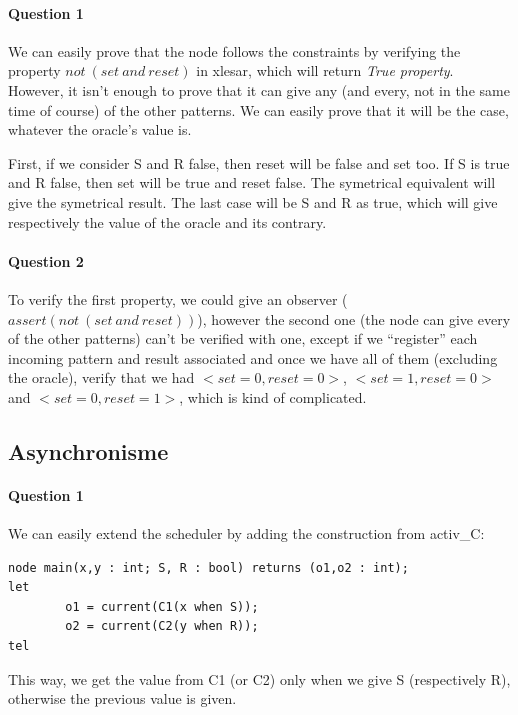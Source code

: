 \documentclass{article}
\begin{document}
\paragraph{Question 1} 

We can easily prove that the node follows the constraints
by verifying the property $not~(set~ and~ reset)$ in xlesar, which will return
\emph{True property}. However, it isn't enough to prove that it can give any
(and every, not in the same time of course) of the other patterns. We can easily
prove that it will be the case, whatever the oracle's value is.

First, if we consider S and R false, then reset will be false and set too. If
S is true and R false, then set will be true and reset false. The symetrical
equivalent will give the symetrical result. The last case will be S and R as
true, which will give respectively the value of the oracle and its contrary.

\paragraph{Question 2} 

To verify the first property, we could give an observer ($assert(not~(set~ and~
reset))$), however the second one (the node can give every of the other
patterns) can't be verified with one, except if we ``register'' each incoming
pattern and result associated  and once we have all of them (excluding the
oracle), verify that we had $<set=0, reset=0>$, $<set=1, reset=0>$ and $<set=0,
reset=1>$, which is kind of complicated.

\subsection{Asynchronisme}

\paragraph{Question 1}

We can easily extend the scheduler by adding the construction from activ\_C:

\begin{verbatim}
node main(x,y : int; S, R : bool) returns (o1,o2 : int);
let
        o1 = current(C1(x when S));
        o2 = current(C2(y when R));
tel
\end{verbatim}

This way, we get the value from C1 (or C2) only when we give S (respectively R),
otherwise the previous value is given.
\end{document}
